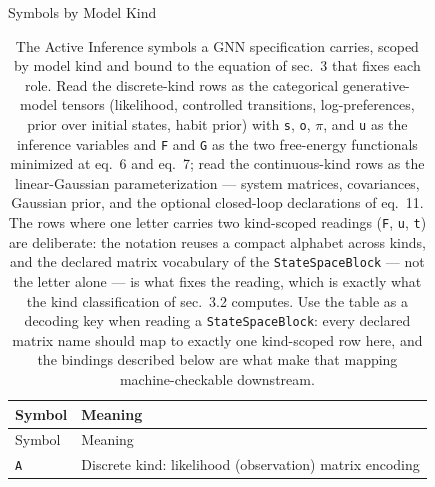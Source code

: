 \documentclass[
  ignorenonframetext,
]{beamer}
\begin{document}
\begin{frame}{Symbols by Model Kind}
\begin{longtable}[]{@{}
  >{\raggedright\arraybackslash}p{}
  >{\raggedright\arraybackslash}p{}@{}}
\caption{The Active Inference symbols a GNN specification carries,
scoped by model kind and bound to the equation of
sec.~3 that fixes each role. Read the
discrete-kind rows as the categorical generative-model tensors
(likelihood, controlled transitions, log-preferences, prior over initial
states, habit prior) with \protect\texttt{s}, \protect\texttt{o},
\protect\texttt{\texorpdfstring{\ensuremath{\pi}}{pi}}, and \protect\texttt{u} as the inference variables
and \protect\texttt{F} and \protect\texttt{G} as the two free-energy
functionals minimized at eq.~6 and eq.~7; read the
continuous-kind rows as the linear-Gaussian parameterization --- system
matrices, covariances, Gaussian prior, and the optional closed-loop
declarations of eq.~11. The rows where one letter
carries two kind-scoped readings (\protect\texttt{F},
\protect\texttt{u}, \protect\texttt{t}) are deliberate: the notation
reuses a compact alphabet across kinds, and the declared matrix
vocabulary of the \protect\texttt{StateSpaceBlock} --- not the letter
alone --- is what fixes the reading, which is exactly what the kind
classification of sec.~3.2 computes. Use the table as
a decoding key when reading a \protect\texttt{StateSpaceBlock}: every
declared matrix name should map to exactly one kind-scoped row here, and
the \protect{} bindings described
below are what make that mapping machine-checkable
downstream.}\label{tbl:actinf_symbols}\tabularnewline
\toprule\noalign{}
\begin{minipage}[b]{\linewidth}\raggedright
Symbol
\end{minipage} & \begin{minipage}[b]{\linewidth}\raggedright
Meaning
\end{minipage} \\
\midrule\noalign{}
\endfirsthead
\toprule\noalign{}
\begin{minipage}[b]{\linewidth}\raggedright
Symbol
\end{minipage} & \begin{minipage}[b]{\linewidth}\raggedright
Meaning
\end{minipage} \\
\midrule\noalign{}
\endhead
\texttt{A} & Discrete kind: likelihood (observation) matrix encoding

\end{longtable}
\end{frame}
\end{document}

